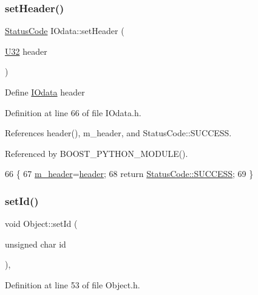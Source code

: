 \subsubsection{\texorpdfstring{set\+Header()}{setHeader()}}
{\footnotesize\ttfamily \hyperlink{classStatusCode}{Status\+Code} I\+Odata\+::set\+Header (\begin{DoxyParamCaption}\item[{\hyperlink{classIOdata_a96fb57f5fcd87b708743abd3c86a5198}{U32}}]{header }\end{DoxyParamCaption})\hspace{0.3cm}{\ttfamily [inline]}}

Define \hyperlink{classIOdata}{I\+Odata} header 

Definition at line 66 of file I\+Odata.\+h.



References header(), m\+\_\+header, and Status\+Code\+::\+S\+U\+C\+C\+E\+SS.



Referenced by B\+O\+O\+S\+T\+\_\+\+P\+Y\+T\+H\+O\+N\+\_\+\+M\+O\+D\+U\+L\+E().


\begin{DoxyCode}
66                                   \{
67     \hyperlink{classIOdata_a46ec7dbfa257c02be1d39c4799f157d3}{m\_header}=\hyperlink{classIOdata_a503396d8deb6e098c15f963e4201e01b}{header};
68     \textcolor{keywordflow}{return} \hyperlink{classStatusCode_a6f565cbeadc76d14c72f047e5e85eb4badd0da38d3ba0d922efd1f4619bc37ad8}{StatusCode::SUCCESS};
69   \}
\end{DoxyCode}
\mbox{\label{classObject_a398fe08cba594a0ce6891d59fe4f159f}} 
\subsubsection{\texorpdfstring{set\+Id()}{setId()}}
{\footnotesize\ttfamily void Object\+::set\+Id (\begin{DoxyParamCaption}\item[{unsigned char}]{id }\end{DoxyParamCaption})\hspace{0.3cm}{\ttfamily [inline]}, {\ttfamily [inherited]}}



Definition at line 53 of file Object.\+h.



